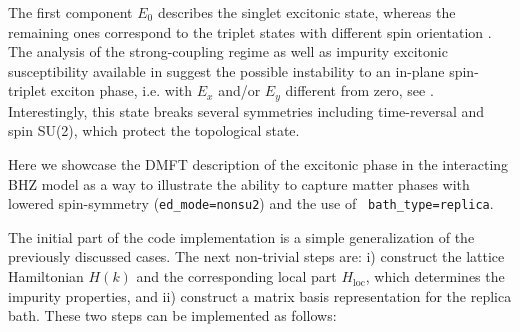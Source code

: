 \documentclass[edipack_sp.tex]{subfiles}
\begin{document}
The first component $E_0$ describes the singlet excitonic state,
whereas the remaining ones correspond to the triplet states with
different spin orientation \cite{Blason2020PRB,Amaricci2023PRB}.   
The analysis of the strong-coupling regime as well as impurity
excitonic susceptibility available in \NAME suggest the possible
instability to an in-plane spin-triplet exciton phase, i.e. with $E_x$
and/or $E_y$ different from zero, see \cite{Amaricci2023PRB}.
Interestingly, this state breaks several symmetries including
time-reversal and spin SU(2), which protect the topological state.

Here we showcase the DMFT description of the excitonic phase in the interacting BHZ model as a way to
illustrate the \NAME ability to capture matter phases with lowered spin-symmetry ({\tt ed\_mode=nonsu2}) and the use of {\tt
  bath\_type=replica}.

The initial part of the code implementation is a simple generalization of the previously discussed cases. 
The next non-trivial steps are: i) construct the lattice Hamiltonian $H(k)$ and the corresponding local part $H_\mathrm{loc}$, which determines the impurity properties, and ii) construct a matrix basis representation for the replica bath. These two steps can be implemented as follows: 
\end{document}
